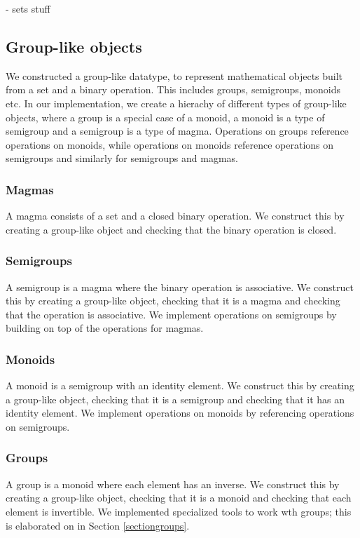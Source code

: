 \documentclass{article}
\begin{document}
            - sets stuff
        
        
        \subsection{Group-like objects}
            We constructed a group-like datatype, to represent mathematical objects built from a set and a binary operation. This includes groups, semigroups, monoids etc. In our implementation, we create a hierachy of different types of group-like objects, where a group is a special case of a monoid, a monoid is a type of semigroup and a semigroup is a type of magma. Operations on groups reference operations on monoids, while operations on monoids reference operations on semigroups and similarly for semigroups and magmas. 


		\subsubsection{Magmas}
			A magma consists of a set and a closed binary operation. We construct this by creating a group-like object and checking that the binary operation is closed.

		\subsubsection{Semigroups}
			A semigroup is a magma where the binary operation is associative. We construct this by creating a group-like object, checking that it is a magma and checking that the operation is associative. We implement operations on semigroups by building on top of the operations for magmas.

		\subsubsection{Monoids}
			A monoid is a semigroup with an identity element. We construct this by creating a group-like object, checking that it is a semigroup and checking that it has an identity element. We implement operations on monoids by referencing operations on semigroups.

		\subsubsection{Groups}
			A group is a monoid where each element has an inverse. We construct this by creating a group-like object, checking that it is a monoid and checking that each element is invertible. We implemented specialized tools to work wth groups; this is elaborated on in Section \ref{sectiongroups}.
        
\end{document}
